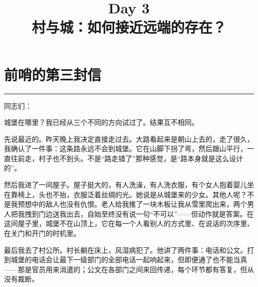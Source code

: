 \documentclass[12pt,a4paper]{article}
\title{\bfseries Day 3\\[0.3em]村与城：如何接近远端的存在？}
\author{}
\date{}
\begin{document}
\maketitle

\vspace{-2em}

\vspace{1em}

\section{前哨的第三封信}
\vspace{0.5em}
\vspace{0.3em}

\noindent\rule{\textwidth}{0.4pt}

\vspace{0.3em}



同志们：



城堡在哪里？我已经从三个不同的方向试过了。结果互不相同。



先说最近的。昨天晚上我决定直接走过去。大路看起来是朝山上去的，走了很久，我确认了一件事：这条路永远不会到城堡。它在山脚下拐了弯，然后跟山平行，一直往前走，村子也不到头。不是“路走错了”那种感觉，是“路本身就是这么设计的”。



然后我进了一间屋子。屋子挺大的，有人洗澡，有人洗衣服，有个女人抱着婴儿坐在靠椅上，头也不抬，衣服泛着丝绸的光。她说是从城堡来的少女。其他人呢？不是我预想中的敌人也没有仇恨。老人给我推了一块木板让我从雪里爬出来，两个男人把我拽到门边送我出去，自始至终没有说一句“不可以”——但动作就是答案。在这间屋子里，城堡不在山顶上，它在每一个人看别人的方式里、在说话的次序里、在关门和开门的时机里。



最后我去了村公所。村长躺在床上，风湿病犯了。他讲了两件事：电话和公文。打到城堡的电话会让最下一级部门的全部电话一起响起来，但即便通了也不能当真——那是官员用来消遣的；公文在各部门之间来回传递，每个环节都有答复，但从没有裁断。
\end{document}
